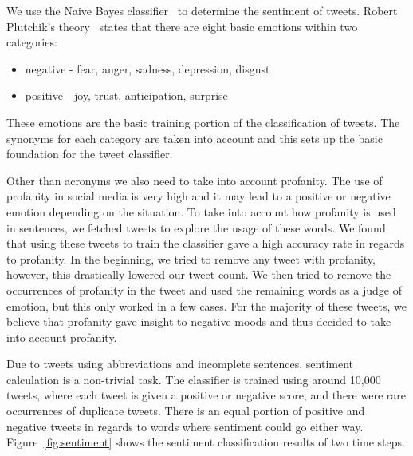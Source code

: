 We use the Naive Bayes classifier~\cite{pak2010twitter} to determine the sentiment of tweets. Robert Plutchik's theory~\cite{Plutchik2002} states that there are eight basic emotions within two categories:
\begin{itemize}
\vspace{-0.05in}
\setlength{\topsep}{-0.1in}
\setlength{\itemsep}{-0.05in}
\item negative - fear, anger, sadness, depression, disgust
\item positive - joy, trust, anticipation, surprise
\end{itemize}
\vspace{-0.05in}
These emotions are the basic training portion of the classification of tweets. The synonyms for each category are taken into account and this sets up the basic foundation for the tweet classifier.

Other than acronyms we also need to take into account profanity. The use of profanity in social media is very high and it may lead to a positive or negative emotion depending on the situation. To take into account how profanity is used in sentences, we fetched tweets to explore the usage of these words. We found that using these tweets to train the classifier gave a high accuracy rate in regards to profanity. In the beginning, we tried to remove any tweet with profanity, however, this drastically lowered our tweet count. We then tried to remove the occurrences of profanity in the tweet and used the remaining words as a judge of emotion, but this only worked in a few cases. For the majority of these tweets, we believe that profanity gave insight to negative moods and thus decided to take into account profanity.

Due to tweets using abbreviations and incomplete sentences, sentiment calculation is a non-trivial task. The classifier is trained using around 10,000 tweets, where each tweet is given a positive or negative score, and there were rare occurrences of duplicate tweets. There is an equal portion of positive and negative tweets in regards to words where sentiment could go either way. Figure~\ref{fig:sentiment} shows the sentiment classification results of two time steps.

